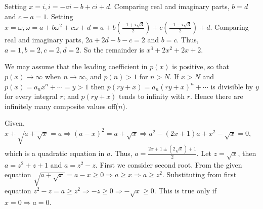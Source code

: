   Setting $x = i, i = -ai - b + ci + d$. Comparing real and imaginary parts, $b = d$ and $c - a = 1$. Setting
  $x = \omega, \omega = a + b\omega^2 + c\omega + d = a + b\left(\frac{-1 + i\sqrt{3}}{2}\right) +
  c\left(\frac{-1 - i\sqrt{3}}{2}\right) + d$. Comparing real and imaginary parts, $2a + 2d - b - c = 2$ and
  $b = c$. Thus, $a = 1, b = 2, c = 2, d = 2$. So the remainder is $x^3 + 2x^2 + 2x + 2$.
\item We may assume that the leading coefficient in $p(x)$ is positive, so that $p(x)\rightarrow \infty$
  when $n\rightarrow \infty$, and $p(n) > 1$ for $n > N$. If $x > N$ and $p(x) = a_nx^n + \cdots = y > 1$
  then $p(ry + x) = a_n(ry + x)^n + \cdots $ is divisible by $y$ for every integral $r$; and $p(ry + x)$
  tends to infinity with $r$. Hence there are infinitely many composite values off($n$).
\item Given, $x + \sqrt{a + \sqrt{x}} = a \Rightarrow (a - x)^2 = a + \sqrt{x} \Rightarrow a^2 - (2x + 1)a +
  x^2 - \sqrt{x} = 0$, which is a quadratic equation in $a$. Thus, $a = \frac{2x + 1 \pm (2\sqrt{x}) +
    1}{2}$. Let $z = \sqrt{x}$, then $a = z^2 + z + 1$ and $a = z^2 - z$. First we consider second root. From
  the given equation $\sqrt{a + \sqrt{x}} = a - x\geq 0 \Rightarrow a \geq x \Rightarrow a \geq
  z^2$. Substituting from first equation $z^2 - z = a \geq z^2 \Rightarrow -z\geq 0 \Rightarrow
  -\sqrt{x}\geq 0$. This is true only if $x = 0 \Rightarrow a = 0$.

